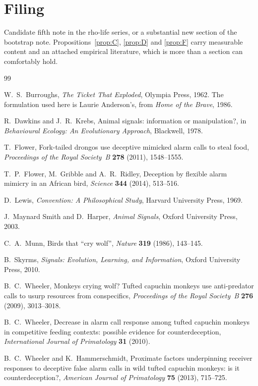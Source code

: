 \documentclass[11pt]{article}
\theoremstyle{plain}
\theoremstyle{definition}
\begin{document}
\section{Filing}
\label{sec:filing}

Candidate fifth note in the rho-life series, or a substantial new section of the bootstrap note.
Propositions~\ref{prop:C}, \ref{prop:D} and \ref{prop:F} carry measurable content and an attached
empirical literature, which is more than a section can comfortably hold.

\begin{thebibliography}{99}

 W.~S.~Burroughs, \emph{The Ticket That Exploded}, Olympia Press, 1962. The
formulation used here is Laurie Anderson's, from \emph{Home of the Brave}, 1986.

 R.~Dawkins and J.~R.~Krebs, Animal signals: information or manipulation?, in
\emph{Behavioural Ecology: An Evolutionary Approach}, Blackwell, 1978.

 T.~Flower, Fork-tailed drongos use deceptive mimicked alarm calls to steal food,
\emph{Proceedings of the Royal Society~B} \textbf{278} (2011), 1548--1555.

 T.~P.~Flower, M.~Gribble and A.~R.~Ridley, Deception by flexible alarm mimicry in
an African bird, \emph{Science} \textbf{344} (2014), 513--516.

 D.~Lewis, \emph{Convention: A Philosophical Study}, Harvard University Press, 1969.

 J.~Maynard Smith and D.~Harper, \emph{Animal Signals}, Oxford University Press,
2003.

 C.~A.~Munn, Birds that ``cry wolf'', \emph{Nature} \textbf{319} (1986), 143--145.

 B.~Skyrms, \emph{Signals: Evolution, Learning, and Information}, Oxford University
Press, 2010.

 B.~C.~Wheeler, Monkeys crying wolf? Tufted capuchin monkeys use anti-predator
calls to usurp resources from conspecifics, \emph{Proceedings of the Royal Society~B} \textbf{276}
(2009), 3013--3018.

 B.~C.~Wheeler, Decrease in alarm call response among tufted capuchin monkeys in
competitive feeding contexts: possible evidence for counterdeception, \emph{International Journal of
Primatology} \textbf{31} (2010).

 B.~C.~Wheeler and K.~Hammerschmidt, Proximate factors underpinning receiver
responses to deceptive false alarm calls in wild tufted capuchin monkeys: is it counterdeception?,
\emph{American Journal of Primatology} \textbf{75} (2013), 715--725.

\end{thebibliography}
\end{document}

